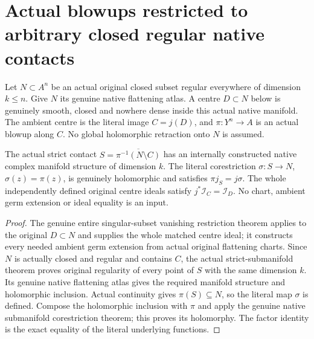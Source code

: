 \section{Actual blowups restricted to arbitrary closed regular native contacts}

Let $N\subset A^n$ be an actual original closed subset regular everywhere
of dimension $k\le n$. Give $N$ its genuine native flattening atlas.
A centre $D\subset N$ below is genuinely smooth, closed and nowhere dense
inside this actual native manifold. The ambient centre is the literal
image $C=j(D)$, and $\pi:Y^n\to A$ is an actual blowup along $C$.
No global holomorphic retraction onto $N$ is assumed.

\begin{theorem}
\label{hir:actual-closed-contact-native-geometry}
\leanok
The actual strict contact
$S=\overline{\pi^{-1}(N\setminus C)}$ has an internally constructed
native complex manifold structure of dimension $k$. The literal
corestriction $\sigma:S\to N$, $\sigma(z)=\pi(z)$, is genuinely
holomorphic and satisfies $\pi j_S=j\sigma$. The whole independently
defined original centre ideals satisfy $j^*\mathcal I_C=\mathcal I_D$.
No chart, ambient germ extension or ideal equality is an input.
\end{theorem}
\begin{proof}
The genuine entire singular-subset vanishing restriction theorem applies
to the original $D\subset N$ and supplies the whole matched centre ideal;
it constructs every needed ambient germ extension from actual original
flattening charts. Since $N$ is actually closed and regular and contains
$C$, the actual strict-submanifold theorem proves original regularity of
every point of $S$ with the same dimension $k$. Its genuine native
flattening atlas gives the required manifold structure and holomorphic
inclusion. Actual continuity gives $\pi(S)\subseteq N$, so the literal
map $\sigma$ is defined. Compose the holomorphic inclusion with $\pi$
and apply the genuine native submanifold corestriction theorem; this
proves its holomorphy. The factor identity is the exact equality of the
literal underlying functions.
\end{proof}

